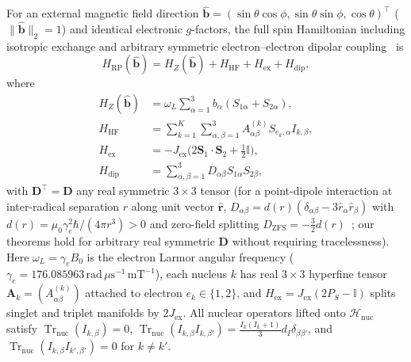 \documentclass[twocolumn,10pt,amsmath,amssymb,floatfix]{revtex4-2}
\theoremstyle{plain}
\theoremstyle{definition}
\newcommand{\Tr}{\operatorname{Tr}}
\newcommand{\PS}{P_S}
\newcommand{\HRP}{H_{\mathrm{RP}}}
\newcommand{\HZ}{H_Z}
\newcommand{\HHF}{H_{\mathrm{HF}}}
\newcommand{\Hex}{H_{\mathrm{ex}}}
\newcommand{\Hdip}{H_{\mathrm{dip}}}
\begin{document}
For an external magnetic field direction $\hat{\mathbf{b}} = (\sin\theta\cos\phi, \sin\theta\sin\phi, \cos\theta)^\top$ ($\|\hat{\mathbf{b}}\|_2 = 1$) and identical electronic $g$-factors, the full spin Hamiltonian including isotropic exchange and arbitrary symmetric electron--electron dipolar coupling~\cite{Efimova2008BJ,Babcock2020JPCL} is
\begin{equation}
\label{eq:HRP}
\HRP(\hat{\mathbf{b}}) = \HZ(\hat{\mathbf{b}}) + \HHF + \Hex + \Hdip,
\end{equation}
where
\begin{align}
\label{eq:Hparts}
\HZ(\hat{\mathbf{b}}) &= \omega_L \sum_{\alpha=1}^3 b_\alpha (S_{1\alpha} + S_{2\alpha}), \nonumber\\
\HHF &= \sum_{k=1}^K \sum_{\alpha,\beta=1}^3 A^{(k)}_{\alpha\beta} S_{e_k,\alpha} I_{k,\beta}, \nonumber\\
\Hex &= -J_{\mathrm{ex}} \bigl(2\mathbf{S}_1\cdot\mathbf{S}_2 + \tfrac{1}{2}\mathbb{I}\bigr), \nonumber\\
\Hdip &= \sum_{\alpha,\beta=1}^3 D_{\alpha\beta} S_{1\alpha} S_{2\beta},
\end{align}
with $\mathbf{D}^\top = \mathbf{D}$ any real symmetric $3\times 3$ tensor (for a point-dipole interaction at inter-radical separation $r$ along unit vector $\hat{\mathbf{r}}$, $D_{\alpha\beta} = d(r)(\delta_{\alpha\beta} - 3\hat{r}_\alpha\hat{r}_\beta)$ with $d(r) = \mu_0 \gamma_e^2 \hbar / (4\pi r^3) > 0$ and zero-field splitting $D_{\mathrm{ZFS}} = -\frac{3}{2} d(r)$~\cite{Efimova2008BJ,Babcock2020JPCL}; our theorems hold for arbitrary real symmetric $\mathbf{D}$ without requiring tracelessness). Here $\omega_L = \gamma_e B_0$ is the electron Larmor angular frequency ($\gamma_e = 176.085963\,\text{rad}\,\mu\text{s}^{-1}\,\text{mT}^{-1}$), each nucleus $k$ has real $3\times 3$ hyperfine tensor $\mathbf{A}_k = (A^{(k)}_{\alpha\beta})$ attached to electron $e_k \in \{1,2\}$, and $\Hex = J_{\mathrm{ex}}(2\PS - \mathbb{I})$ splits singlet and triplet manifolds by $2J_{\mathrm{ex}}$. All nuclear operators lifted onto $\mathcal{H}_{\mathrm{nuc}}$ satisfy $\Tr_{\mathrm{nuc}}(I_{k,\beta}) = 0$, $\Tr_{\mathrm{nuc}}(I_{k,\beta} I_{k,\beta'}) = \frac{I_k(I_k+1)}{3} d_I \delta_{\beta\beta'}$, and $\Tr_{\mathrm{nuc}}(I_{k,\beta} I_{k',\beta'}) = 0$ for $k\neq k'$.
\end{document}
